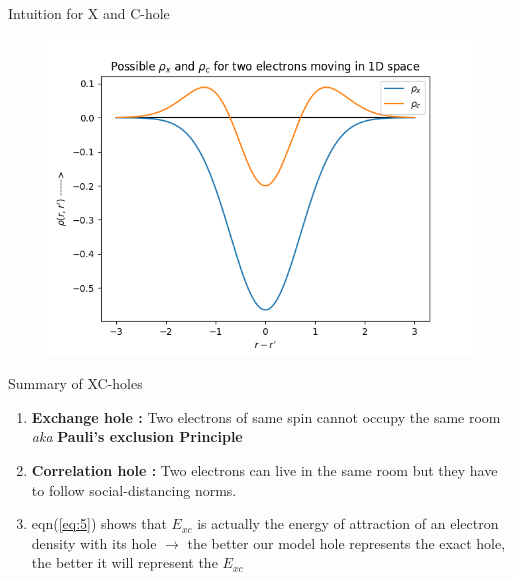 \documentclass{beamer}
\begin{document}
	\begin{frame}[t]{Intuition for X and C-hole}
	\begin{figure}
	\centering
	\includegraphics[scale=0.65]{nx_nc.png}
	\end{figure}
	\end{frame}
	
	\begin{frame}[t]{Summary of XC-holes}
	\begin{enumerate}
	\item{\textbf{Exchange hole :} Two electrons of same spin cannot occupy the same room \textit{aka} \textbf{Pauli's exclusion Principle}}\pause \\
	\vspace{0.5cm}
	\item{\textbf{Correlation hole :} Two electrons can live in the same room but they have to follow social-distancing norms.}\pause \\
	\vspace{0.5cm}
	\item{eqn(\ref{eq:5}) shows that $E_{xc}$ is actually the energy of attraction of an electron density with its hole $\rightarrow$ the better our model hole represents the exact hole, the better it will represent the $E_{xc}$}\pause
	\end{enumerate}
	\end{frame}
	
\end{document}
